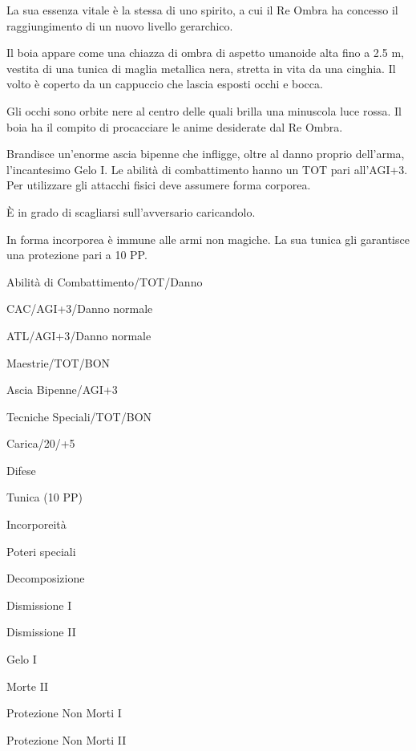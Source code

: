 
La sua essenza vitale \`e la stessa di uno spirito, a cui il Re Ombra
ha concesso il raggiungimento di un nuovo livello gerarchico. 

Il boia appare come una chiazza di ombra di aspetto umanoide alta fino
a 2.5 m, vestita di una tunica di maglia metallica nera, stretta in
vita da una cinghia. Il volto \`e coperto da un cappuccio che lascia
esposti occhi e bocca.

Gli occhi sono orbite nere al centro delle quali brilla una minuscola
luce rossa. Il boia ha il compito di procacciare le anime desiderate
dal Re Ombra. 


Brandisce un'enorme ascia bipenne che infligge, oltre al danno proprio
dell'arma, l'incantesimo Gelo I. Le abilit\`a di combattimento hanno
un TOT pari all'AGI+3. Per utilizzare gli attacchi fisici deve
assumere forma corporea.

\`E in grado di scagliarsi sull'avversario caricandolo. 

In forma incorporea \`e immune alle armi non magiche. La sua tunica
gli garantisce una protezione pari a 10 PP.


\begin{parmostro}{Abilit\`a di Combattimento/TOT/Danno}
\item  CAC/AGI+3/Danno normale
\item  ATL/AGI+3/Danno normale
\end{parmostro}

\begin{parmostro}{Maestrie/TOT/BON}
\item Ascia Bipenne/AGI+3
\end{parmostro}

\begin{parmostro}{Tecniche Speciali/TOT/BON}
\item Carica/20/+5
\end{parmostro}

\begin{parmostro}{Difese}
\item Tunica (10 PP) 
\item Incorporeit\`a
\end{parmostro}

\begin{parmostro}{Poteri speciali}
\item Decomposizione
\item Dismissione I
\item Dismissione II
\item Gelo I
\item Morte II
\item Protezione Non Morti I
\item Protezione Non Morti II
\end{parmostro}

